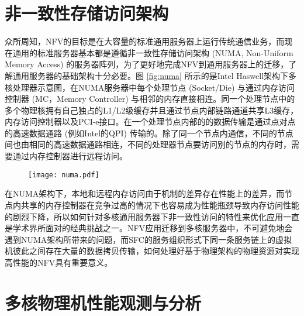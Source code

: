 \section{非一致性存储访问架构}
众所周知，NFV的目标是在大容量的标准通用服务器上运行传统通信业务，而现在通用的标准服务器基本都是遵循非一致性存储访问架构 (NUMA, Non-Uniform Memory Access) 的服务器阵列，为了更好地完成NFV到通用服务器上的迁移，了解通用服务器的基础架构十分必要。图 \ref{fig:numa} 所示的是Intel Haswell架构下多核处理器示意图，在NUMA服务器中每个处理节点 (Socket/Die) 与通过内存访问控制器 (MC，Memory Controller) 与相邻的内存直接相连。同一个处理节点中的多个物理核拥有自己独占的L1/L2级缓存并且通过节点内部链路通道共享L3缓存，内存访问控制器以及PCI-e接口。在一个处理节点内部的的数据传输是通过点对点的高速数据通路 (例如Intel的QPI) 传输的。除了同一个节点内通信，不同的节点间也由相同的高速数据通路相连，不同的处理器节点要访问别的节点的内存时，需要通过内存控制器进行远程访问。
\begin{figure}[!htp]
	\centering
	\texttt{[image: numa.pdf]}
\end{figure}
在NUMA架构下，本地和远程内存访问由于机制的差异存在性能上的差异，而节点内共享的内存控制器在竞争过高的情况下也容易成为性能瓶颈导致内存访问性能的剧烈下降，所以如何针对多核通用服务器下非一致性访问的特性来优化应用一直是学术界所面对的经典挑战之一。NFV应用迁移到多核服务器中，不可避免地会遇到NUMA架构所带来的问题，而SFC的服务组织形式下同一条服务链上的虚拟机彼此之间存在大量的数据拷贝传输，如何处理好基于物理架构的物理资源对实现高性能的NFV具有重要意义。
\begin{figure}[!htp]
	\centering
\end{figure}
\section{多核物理机性能观测与分析}
\label{related:observe}


